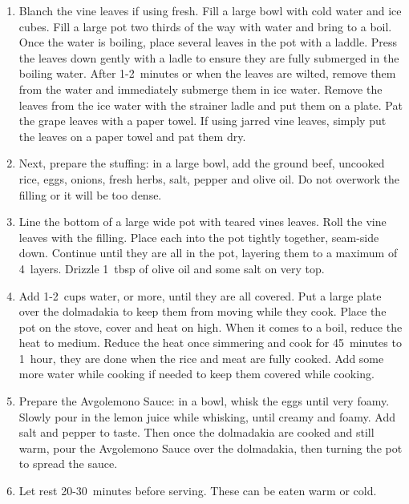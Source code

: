 \begin{enumerate}
    \item Blanch the vine leaves if using fresh. Fill a large bowl with cold water and ice cubes. Fill a large pot two thirds of the way with water and bring to a boil. Once the water is boiling, place several leaves in the pot with a laddle. Press the leaves down gently with a ladle to ensure they are fully submerged in the boiling water. After 1-2~minutes or when the leaves are wilted, remove them from the water and immediately submerge them in ice water. Remove the leaves from the ice water with the strainer ladle and put them on a plate. Pat the grape leaves with a paper towel. If using jarred vine leaves, simply put the leaves on a paper towel and pat them dry.
    \item Next, prepare the stuffing: in a large bowl, add the ground beef, uncooked rice, eggs, onions, fresh herbs, salt, pepper and olive oil. Do not overwork the filling or it will be too dense.
    \item Line the bottom of a large wide pot with teared vines leaves. Roll the vine leaves with the filling. Place each into the pot tightly together, seam-side down. Continue until they are all in the pot, layering them to a maximum of 4~layers. Drizzle 1~tbsp of olive oil and some salt on very top.
    \item Add 1-2~cups water, or more, until they are all covered. Put a large plate over the dolmadakia to keep them from moving while they cook. Place the pot on the stove, cover and heat on high. When it comes to a boil, reduce the heat to medium. Reduce the heat once simmering and cook for 45~minutes to 1~hour, they are done when the rice and meat are fully cooked. Add some more water while cooking if needed to keep them covered while cooking.
    \item Prepare the Avgolemono Sauce: in a bowl, whisk the eggs until very foamy. Slowly pour in the lemon juice while whisking, until creamy and foamy. Add salt and pepper to taste. Then once the dolmadakia are cooked and still warm, pour the Avgolemono Sauce over the dolmadakia, then turning the pot to spread the sauce.
    \item Let rest 20-30~minutes before serving. These can be eaten warm or cold.
\end{enumerate}

